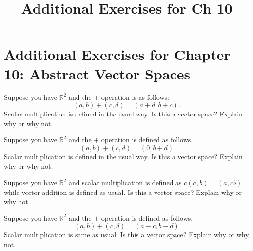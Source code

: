 \documentclass{ximera}
\title{Additional Exercises for Ch 10} \license{CC BY-NC-SA 4.0}
\begin{document}
\begin{abstract}
\end{abstract}
\maketitle

\section*{Additional Exercises for Chapter 10: Abstract Vector Spaces}


\begin{problem}\label{prb:10.1} Suppose you have $\mathbb{R}^{2}$ and the $+$ operation is as
follows:\
\begin{equation*}
\left( a,b\right) +\left( c,d\right) =\left( a+d,b+c\right) .
\end{equation*}
Scalar multiplication is defined in the usual way. Is this a vector space?
Explain why or why not.
\end{problem}

\begin{problem}\label{prb:10.2} Suppose you have $\mathbb{R}^{2}$ and the $+$ operation is defined as
follows.
\begin{equation*}
\left( a,b\right) +\left( c,d\right) =\left( 0,b+d\right)
\end{equation*}
Scalar multiplication is defined in the usual way. Is this a vector space?
Explain why or why not.
\end{problem}

\begin{problem}\label{prb:10.3} Suppose you have $\mathbb{R}^{2}$ and scalar multiplication is defined
as $c\left( a,b\right) =\left( a,cb\right) $ while vector addition is
defined as usual. Is this a vector space? Explain why or why not.
\end{problem}

\begin{problem}\label{prb:10.4} Suppose you have $\mathbb{R}^{2}$ and the $+$ operation is defined as
follows.
\begin{equation*}
\left( a,b\right) +\left( c,d\right) =\left( a-c,b-d\right)
\end{equation*}
Scalar multiplication is same as usual. Is this a vector space? Explain why
or why not.
\end{problem}
\end{document}
